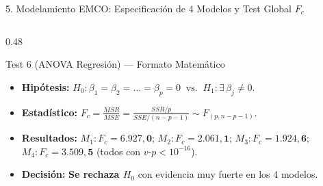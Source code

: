 \documentclass[aspectratio=169, 9pt]{beamer}
\begin{document}
\begin{frame}{5. Modelamiento EMCO: Especificación de 4 Modelos y Test Global $F_c$}
\begin{columns}[T]
\begin{column}{0.48\textwidth}
    \begin{exampleblock}{\footnotesize Test 6 (ANOVA Regresión) — Formato Matemático}
      \scriptsize
      \begin{itemize}\setlength{\itemsep}{1.5pt}
        \item \textbf{Hipótesis:} $H_0: \beta_1 = \beta_2 = \dots = \beta_p = 0 \;\;\text{vs.}\;\; H_1: \exists\,\beta_j \neq 0$.
        \item \textbf{Estadístico:} $F_c = \frac{MSR}{MSE} = \frac{SSR/p}{SSE/(n-p-1)} \sim F_{(p, n-p-1)}$.
        \item \textbf{Resultados:} $M_1: F_c = \mathbf{6.927,0}$; $M_2: F_c = \mathbf{2.061,1}$; $M_3: F_c = \mathbf{1.924,6}$; $M_4: F_c = \mathbf{3.509,5}$ (todos con $v\text{-}p < 10^{-16}$).
        \item \textbf{Decisión:} \textbf{Se rechaza $H_0$} con evidencia muy fuerte en los 4 modelos.
      \end{itemize}
    \end{exampleblock}
  \end{column}
\end{columns}
\end{frame}
\end{document}
